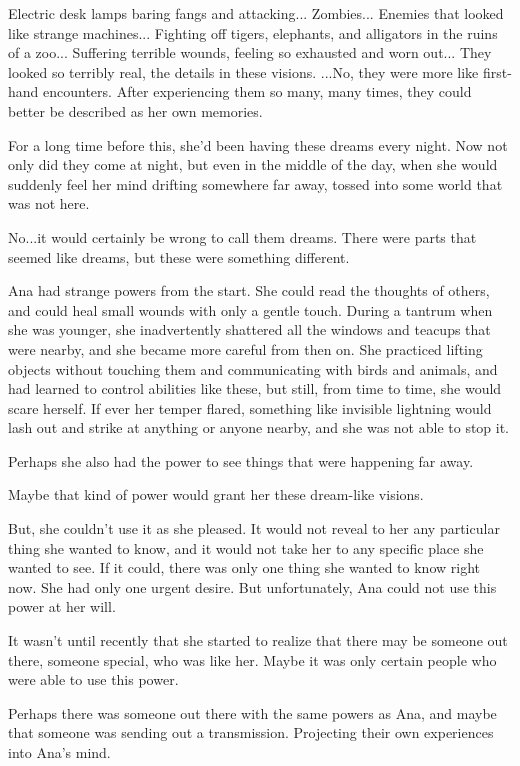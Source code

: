 \documentclass[
]{article}
\begin{document}
Electric desk lamps baring fangs and attacking... Zombies... Enemies
that looked like strange machines... Fighting off tigers, elephants, and
alligators in the ruins of a zoo... Suffering terrible wounds, feeling
so exhausted and worn out... They looked so terribly real, the details
in these visions. ...No, they were more like first-hand encounters.
After experiencing them so many, many times, they could better be
described as her own memories.

For a long time before this, she'd been having these dreams every night.
Now not only did they come at night, but even in the middle of the day,
when she would suddenly feel her mind drifting somewhere far away,
tossed into some world that was not here.

No...it would certainly be wrong to call them dreams. There were parts
that seemed like dreams, but these were something different.

Ana had strange powers from the start. She could read the thoughts of
others, and could heal small wounds with only a gentle touch. During a
tantrum when she was younger, she inadvertently shattered all the
windows and teacups that were nearby, and she became more careful from
then on. She practiced lifting objects without touching them and
communicating with birds and animals, and had learned to control
abilities like these, but still, from time to time, she would scare
herself. If ever her temper flared, something like invisible lightning
would lash out and strike at anything or anyone nearby, and she was not
able to stop it.

Perhaps she also had the power to see things that were happening far
away.

Maybe that kind of power would grant her these dream-like visions.

But, she couldn't use it as she pleased. It would not reveal to her any
particular thing she wanted to know, and it would not take her to any
specific place she wanted to see. If it could, there was only one thing
she wanted to know right now. She had only one urgent desire. But
unfortunately, Ana could not use this power at her will.

It wasn't until recently that she started to realize that there may be
someone out there, someone special, who was like her. Maybe it was only
certain people who were able to use this power.

Perhaps there was someone out there with the same powers as Ana, and
maybe that someone was sending out a transmission. Projecting their own
experiences into Ana's mind.
\end{document}
